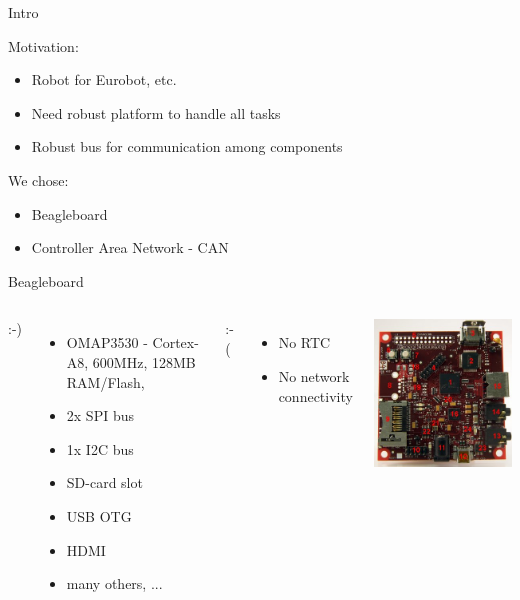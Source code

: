 \documentclass{beamer}
\begin{document}
\begin{frame}{Intro}

Motivation:
\begin{itemize}
\item Robot for Eurobot, etc.
\item Need robust platform to handle all tasks
\item Robust bus for communication among components
\end{itemize}

We chose:
\begin{itemize}
\item Beagleboard
\item Controller Area Network - CAN
\end{itemize}
\end{frame}

\begin{frame}{Beagleboard}
\begin{columns}[c]

:-)
\begin{itemize}
\item OMAP3530 - Cortex-A8, 600MHz, 128MB RAM/Flash,
\item 2x SPI bus 
\item 1x I2C bus 
\item SD-card slot
\item USB OTG
\item HDMI
\item many others, ...
\end{itemize}

:-(
\begin{itemize}
\item No RTC
\item No network connectivity
\end{itemize}

\includegraphics[width=\textwidth]{../img/beagleboard}


\end{columns}
\end{frame}
\end{document}
